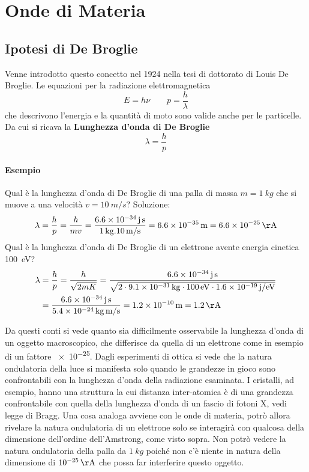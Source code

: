 
\section{Onde di Materia}
\subsection{Ipotesi di De Broglie}
Venne introdotto questo concetto nel 1924 nella tesi di dottorato di Louis De Broglie.
Le equazioni per la radiazione elettromagnetica 
\begin{equation}
E = h\nu \quad \quad p = \frac{ h}{\lambda }
\end{equation}
che descrivono l'energia e la quantità di moto sono valide anche per le particelle.
Da cui si ricava la \textbf{Lunghezza d'onda di De Broglie}
\begin{equation}
\lambda = \frac{ h}{p }
\end{equation}

\paragraph{Esempio}
Qual è la lunghezza d'onda di De Broglie di una palla di massa $ m =\SI{1}{kg}$ che si muove a una velocità $v = \SI{10}{m/s}$?
Soluzione:
\begin{equation}
\lambda = \frac{ h}{p } = \frac{ h}{m v } = \frac{ \SI{6.6e-34}{j.s}}{\SI{1}{kg} . \SI{10}{m/s} } = \SI{6.6e-35}{m} = \SI{6.6e-25}{\AA}
\end{equation}
Qual è la lunghezza d'onda di De Broglie di un elettrone avente energia cinetica \SI{100}{eV}?
\begin{equation}
\begin{split}
\lambda & = \frac{ h}{p } = \frac{ h}{\sqrt{2mK} } 
= \frac{\SI{6.6e-34}{j.s} }{\sqrt{ 2 \cdot \SI{9.1e-31}{kg} \cdot \SI{100}{eV} \cdot \SI{1.6e-19}{j / eV} } } \\
& = \frac{ \SI{6.6e-34}{j.s}}{\SI{5.4e-24}{kg.m/s} } = \SI{1.2e-10}{m} = \SI{1.2}{\AA}
\end{split}
\end{equation}

Da questi conti si vede quanto sia difficilmente osservabile la lunghezza d'onda di un oggetto macroscopico, che differisce da quella di un elettrone come in esempio di un fattore \SI{e-25}{}.
Dagli esperimenti di ottica si vede che la natura ondulatoria della luce si manifesta solo quando le grandezze in gioco sono confrontabili con la lunghezza d'onda della radiazione esaminata.
I cristalli, ad esempio, hanno una struttura la cui distanza inter-atomica è di una grandezza confrontabile con quella della lunghezza d'onda di un fascio di fotoni X, vedi legge di Bragg.
Una cosa analoga avviene con le onde di materia, potrò allora rivelare la natura ondulatoria di un elettrone solo se interagirà con qualcosa della dimensione dell'ordine dell'Amstrong, come visto sopra.
Non potrò vedere la natura ondulatoria della palla da $\SI{1}{kg}$ poiché non c'è niente in natura della dimensione di $\SI{e-25}{\AA}$ che possa far interferire questo oggetto.



